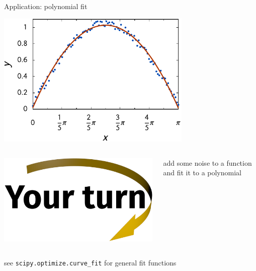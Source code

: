 \documentclass[svgnames]{beamer}
\begin{document}
\begin{frame}{Application: polynomial fit}
 \begin{center}
  \includegraphics[width=0.7\textwidth]{polyfit}
 \end{center}

 \vspace{-0.5truecm}
 \begin{columns}
  \begin{column}{0.4\textwidth}
   \begin{center}
    \includegraphics[width=3truecm]{yourturn}
   \end{center}
  \end{column}%
  \begin{column}{0.6\textwidth}
   add some noise to a function and fit it to a polynomial
  \end{column}%
 \end{columns}

 \vspace{0.3truecm}
 \small{see \texttt{scipy.optimize.curve\_fit} for general fit functions}
\end{frame}
\end{document}
